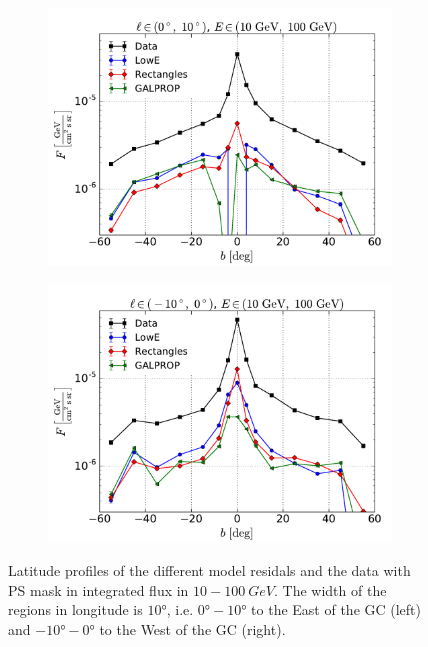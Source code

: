 \begin{figure}[h]
    \begin{subfigure}{0.5\textwidth}
        \includegraphics[width=\textwidth]{plots/Profiles_l=1_source_range_1.pdf}
    \end{subfigure} 
    \begin{subfigure}{0.5\textwidth}
        \includegraphics[width=\textwidth]{plots/Profiles_l=0_source_range_1.pdf}
    \end{subfigure}
  	\caption{Latitude profiles of the different model residals and the data with PS mask in integrated flux in $10 - \SI{100}{GeV}$. The width of the regions in longitude is $\ang{10}$, i.e. $\ang{0} - \ang{10}$ to the East of the GC (left) and $\ang{-10} - \ang{0}$ to the West of the GC (right).}
  	\label{fig:Profiles}
\end{figure}

